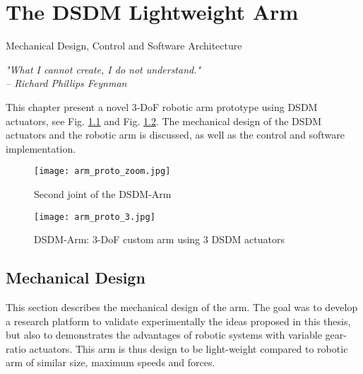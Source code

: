 \chapter{The DSDM Lightweight Arm }
\label{sec:ExperimentalValidation}

\vspace{-5pt}
{ \Large Mechanical Design, Control and Software Architecture }

{
\begin{flushright}
\textit{"What I cannot create, I do not understand."} \\ 
\emph{-- Richard Phillips Feynman}
\end{flushright}
}
\vspace{10pt}



This chapter present a novel 3-DoF robotic arm prototype using DSDM actuators, see Fig. \ref{fig:dsdm_arm_zoom} and Fig. \ref{fig:dsdm_arm}. The mechanical design of the DSDM actuators and the robotic arm is discussed, as well as the control and software implementation.

\begin{figure}[htb]
	\centering
		\texttt{[image: arm\_proto\_zoom.jpg]}
	\caption{Second joint of the DSDM-Arm}
	\label{fig:dsdm_arm_zoom}
\end{figure}

\begin{figure}[htp]
	\centering
		\texttt{[image: arm\_proto\_3.jpg]}
	\caption{DSDM-Arm: 3-DoF custom arm using 3 DSDM actuators}
	\label{fig:dsdm_arm}
\end{figure}

\section{Mechanical Design}

This section describes the mechanical design of the arm. The goal was to develop a research platform to validate experimentally the ideas proposed in this thesis, but also to demonstrates the advantages of robotic systems with variable gear-ratio actuators. This arm is thus design to be light-weight compared to robotic arm of similar size, maximum speeds and forces. 


